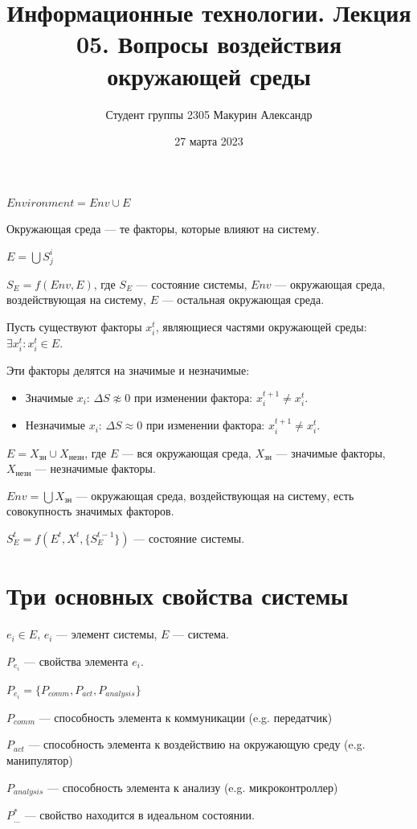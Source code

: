 \documentclass[12pt]{article}
\title{Информационные технологии. Лекция 05. Вопросы воздействия окружающей среды}
\author{Студент группы 2305 Макурин Александр}
\date{27 марта 2023}
\begin{document}
\maketitle
\begin{sloppypar}
    $Environment = Env \cup E$

    Окружающая среда — те факторы, которые влияют на систему.

    $E = \bigcup S^i_j$

    $S_E = f(Env, E)$, где $S_E$ — состояние системы, $Env$ — окружающая среда, воздействующая на систему, $E$ — остальная окружающая среда.

    Пусть существуют факторы $x_i^t$, являющиеся частями окружающей среды: $\exists x_i^t : x_i^t \in E$.

    Эти факторы делятся на значимые и незначимые:
    \begin{itemize}
        \item Значимые $x_i$: $\Delta S \not\approx 0$ при изменении фактора: $x_i^{t + 1} \neq x_i^t$.
        \item Незначимые $x_i$: $\Delta S \approx 0$ при изменении фактора: $x_i^{t + 1} \neq x_i^t$.
    \end{itemize}

    $E = X_{\text{зн}} \cup X_{\text{незн}}$, где $E$ — вся окружающая среда, $X_{\text{зн}}$ — значимые факторы, $X_{\text{незн}}$ — незначимые факторы.

    $Env = \bigcup X_{\text{зн}}$ — окружающая среда, воздействующая на систему, есть совокупность значимых факторов.

    $S_E^t = f(E^t, X^t, \{S_E^{t-1}\})$ — состояние системы.

    \section{Три основных свойства системы}
    $e_i \in E$, $e_i$ — элемент системы, $E$ — система.

    $P_{e_i}$ — свойства элемента $e_i$.

    $P_{e_i} = \{P_{comm}, P_{act}, P_{analysis}\}$

    $P_{comm}$ — способность элемента к коммуникации (e.g. передатчик)

    $P_{act}$ — способность элемента к воздействию на окружающую среду (e.g. манипулятор)

    $P_{analysis}$ — способность элемента к анализу (e.g. микроконтроллер)

    $P^*_{...}$ — свойство находится в идеальном состоянии.


\end{sloppypar}
\end{document}
